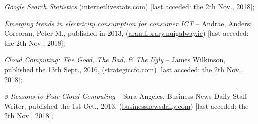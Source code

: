 \documentclass[final, a4paper, 9.5pt]{article}
\begin{document}
\begin{thebibliography}{9}
    \emph{Google Search Statistics}  (\href{http://www.internetlivestats.com/google-search-statistics/}{internetlivestats.com}) [last acceded: the 2th Nov., 2018];
    
    \emph{Emerging trends in electricity consumption for consumer ICT} --
    Andrae, Anders; Corcoran, Peter M., published in 2013,
    (\href{https://aran.library.nuigalway.ie/bitstream/handle/10379/3563/CA_MainArticle14_all-v02.pdf?sequence=4&isAllowed=y}{aran.library.nuigalway.ie}) [last acceded: the 2th Nov., 2018];
    
    \emph{Cloud Computing: The Good, The Bad, \& The Ugly} --
    James Wilkinson, published the 13th Sept., 2016,
    (\href{https://strategiccfo.com/cloud-computing-good-bad-ugly/}{strategiccfo.com}) [last acceded: the 2th Nov., 2018];
    
    \emph{8 Reasons to Fear Cloud Computing} --
    Sara Angeles, Business News Daily Staff Writer, published the 1st Oct., 2013,
    (\href{https://www.businessnewsdaily.com/5215-dangers-cloud-computing.html}{businessnewsdaily.com}) [last acceded: the 2th Nov., 2018];

\end{thebibliography}
\end{document}
